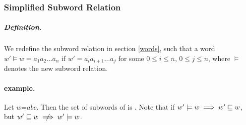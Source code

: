 \subsubsection{Simplified Subword Relation}

\subparagraph{Definition.} 
\label{newsubword}
We redefine the subword relation in section \ref{words}, such that a word $w' \models w = a_1a_2\ldots a_n$ if $w' = a_ia_{i+1}\ldots a_j$ for some $0 \leq i \leq n$, $0 \leq j \leq n$, where $\models$ denotes the new subword relation. 

\paragraph{example.} Let $w$=$abc$. Then the set of subwords of  is . Note that if $w' \models w \implies w' \sqsubseteq w$, but $w' \subword w \centernot\implies w' \models w$. 

